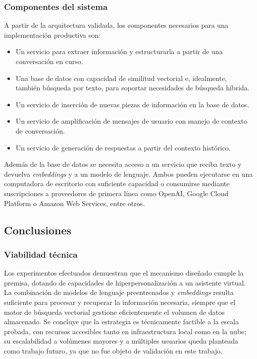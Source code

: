 \subsubsection{Componentes del sistema}

A partir de la arquitectura validada, los componentes necesarios para una implementación productiva son:

\begin{itemize}
	\item Un servicio para extraer información y estructurarla a partir de una conversación en curso.
	\item Una base de datos con capacidad de similitud vectorial e, idealmente, también búsqueda por texto, para soportar necesidades de búsqueda híbrida.
	\item Un servicio de inserción de nuevas piezas de información en la base de datos.
	\item Un servicio de amplificación de mensajes de usuario con manejo de contexto de conversación.
	\item Un servicio de generación de respuestas a partir del contexto histórico.
\end{itemize}

Además de la base de datos se necesita acceso a un servicio que reciba texto y devuelva \textit{embeddings} y a un modelo de lenguaje. Ambos pueden ejecutarse en una computadora de escritorio con suficiente capacidad o consumirse mediante suscripciones a proveedores de primera línea como OpenAI, Google Cloud Platform o Amazon Web Services, entre otros.

\subsection{Conclusiones}

\subsubsection{Viabilidad técnica}

Los experimentos efectuados demuestran que el mecanismo diseñado cumple la premisa, dotando de capacidades de hiperpersonalización a un asistente virtual. La combinación de modelos de lenguaje preentrenados y \textit{embeddings} resulta suficiente para procesar y recuperar la información necesaria, siempre que el motor de búsqueda vectorial gestione eficientemente el volumen de datos almacenado. Se concluye que la estrategia es técnicamente factible a la escala probada, con recursos accesibles tanto en infraestructura local como en la nube; su escalabilidad a volúmenes mayores y a múltiples usuarios queda planteada como trabajo futuro, ya que no fue objeto de validación en este trabajo.

